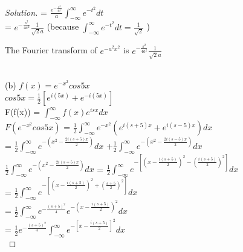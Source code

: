 \documentclass[12pt]{article}
\begin{document}
\begin{proof}[Solution]
                              = $ \frac{e^{-\frac{s^2}{4a^2}}}{a} \int_{-\infty}^{\infty} e^{-t^2} dt $ \\
                            
                              = $ e^{-\frac{s^2}{4a^2}} \frac{1}{\sqrt{2}a}  $  (because   $\int_{-\infty}^{\infty} e^{-t^2} dt  =  \frac{1}{\sqrt{2}}$ )\\
    
\begin{Large}The Fourier  transform of $e^{-a^2x^2}$  is   $ e^{-\frac{s^2}{4a^2}} \frac{1}{\sqrt{2}a}  $\end{Large} \\

(b)   $ f(x) = e^{-x^2}  cos{5x}  $  \\

$ cos{5x} =\frac{1}{2} [e^{i(5x)}+e^{-i(5x)}] $ \\

F(f(x))  = $ \int_{-\infty}^{\infty} f(x) e^{isx} dx$  \\

$F( e^{-x^2}  cos{5x} )$ = $\frac{1}{2} \int_{-\infty}^{\infty}e^{-x^2} (e^{i(s+5)x}+e^{i(s-5)x}) dx $ \\
             
             = $\frac{1}{2} \int_{-\infty}^{\infty} e^{-(x^2 - \frac{2i(s+5)x}{2})} dx$ +$\frac{1}{2} \int_{-\infty}^{\infty} e^{-(x^2-\frac{2i(s-5)x}{2})} dx $ \\
             
 $\frac{1}{2} \int_{-\infty}^{\infty} e^{-(x^2-\frac{2i(s+5)x}{2})} dx $  =  $\frac{1}{2} \int_{-\infty}^{\infty} e^{- [(x-\frac{i(s+5)}{2})^2-(\frac{i(s+5)}{2})^2]} dx$ \\
                                             
                                            =  $\frac{1}{2} \int_{-\infty}^{\infty} e^{- [(x-\frac{i(s+5)}{2})^2 + (\frac{s+5}{2})^2]} dx$   \\
                                            
                                            = $\frac{1}{2} \int_{-\infty}^{\infty} e^{-\frac{(s+5)^2}{4}} e^{-(x-\frac{i(s+5)}{2})^2} dx$ \\
                                            
                                            = $\frac{1}{2} e^{-\frac{(s+5)^2}{4}}\int_{-\infty}^{\infty} e^{-[x-\frac{i(s+5)}{2}]^2} dx $ \\
                                            

\end{proof}
\end{document}

